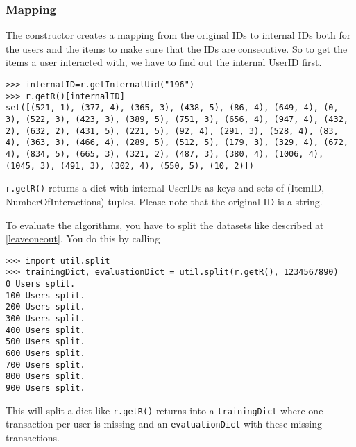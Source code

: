 \subsubsection*{Mapping}
The constructor creates a mapping from the original IDs to internal IDs both for the users
and the items to make sure that the IDs are consecutive. So to get the items a user interacted
with, we have to find out the internal UserID first. 
\begin{lstlisting}[style=python]
>>> internalID=r.getInternalUid("196")
>>> r.getR()[internalID]
set([(521, 1), (377, 4), (365, 3), (438, 5), (86, 4), (649, 4), (0, 3), (522, 3), (423, 3), (389, 5), (751, 3), (656, 4), (947, 4), (432, 2), (632, 2), (431, 5), (221, 5), (92, 4), (291, 3), (528, 4), (83, 4), (363, 3), (466, 4), (289, 5), (512, 5), (179, 3), (329, 4), (672, 4), (834, 5), (665, 3), (321, 2), (487, 3), (380, 4), (1006, 4), (1045, 3), (491, 3), (302, 4), (550, 5), (10, 2)])
\end{lstlisting}
\lstinline!r.getR()! returns a dict with internal UserIDs as keys and sets of (ItemID, NumberOfInteractions) tuples.
Please note that the original ID is a string.

To evaluate the algorithms, you have to split the datasets like described at \ref{leaveoneout}.
You do this by calling
\begin{lstlisting}[style=python]
>>> import util.split
>>> trainingDict, evaluationDict = util.split(r.getR(), 1234567890)
0 Users split.
100 Users split.
200 Users split.
300 Users split.
400 Users split.
500 Users split.
600 Users split.
700 Users split.
800 Users split.
900 Users split.
\end{lstlisting}
This will split a dict like \lstinline!r.getR()! returns into a \lstinline!trainingDict! where one transaction
per user is missing and an \lstinline!evaluationDict! with these missing transactions.


